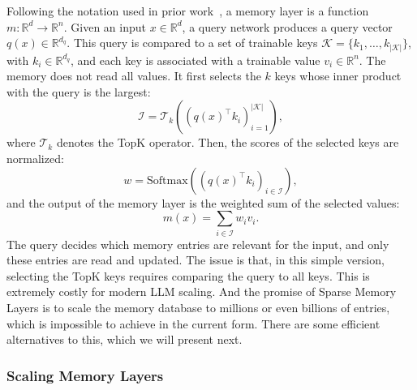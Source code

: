 Following the notation used in prior work~\citep{lample2019largememorylayersproduct},
a memory layer is a function $m:\mathbb{R}^{d}\to\mathbb{R}^{n}$. Given an input
$x \in \mathbb{R}^{d}$, a query network produces a query vector
$q(x)\in\mathbb{R}^{d_q}$. This query is compared to a set of trainable keys
$\mathcal{K}=\{k_1,\ldots,k_{|\mathcal{K}|}\}$, with
$k_i\in\mathbb{R}^{d_q}$, and each key is associated with a trainable value
$v_i\in\mathbb{R}^{n}$.
The memory does not read all values. It first selects the $k$ keys whose inner
product with the query is the largest:
\begin{equation}
    \mathcal{I}
    = \mathcal{T}_{k}\left(\left(q(x)^\top k_i\right)_{i=1}^{|\mathcal{K}|}\right),
\end{equation}
where $\mathcal{T}_{k}$ denotes the TopK operator. Then, the scores of the
selected keys are normalized:
\begin{equation}
    w = \mathrm{Softmax}\left(\left(q(x)^\top k_i\right)_{i\in\mathcal{I}}\right),
\end{equation}
and the output of the memory layer is the weighted sum of the selected values:
\begin{equation}
    m(x) = \sum_{i\in\mathcal{I}} w_i v_i.
\end{equation}
The query decides which memory entries are relevant for the input,
and only these entries are read and updated.
The issue is that, in this simple version, selecting the TopK keys requires
comparing the query to all keys. This is extremely costly for modern
LLM scaling. And the promise of Sparse Memory Layers is to scale the
memory database to millions or even billions of entries, which
is impossible to achieve in the current form.
There are some efficient alternatives to this, which we will
present next.

\subsubsection{Scaling Memory Layers}
